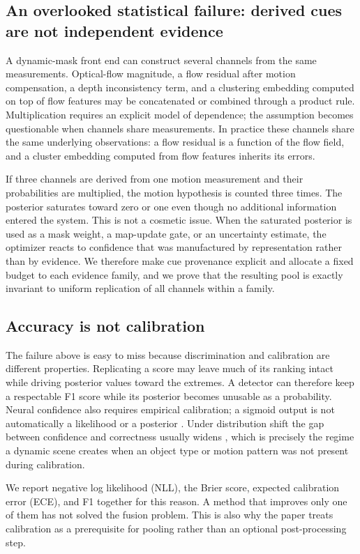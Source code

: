 \documentclass[10pt,conference]{IEEEtran}
\begin{document}
\subsection{An overlooked statistical failure: derived cues are not independent evidence}
A dynamic-mask front end can construct several channels from the same measurements. Optical-flow magnitude, a flow residual after motion compensation, a depth inconsistency term, and a clustering embedding computed on top of flow features may be concatenated or combined through a product rule. Multiplication requires an explicit model of dependence; the assumption becomes questionable when channels share measurements. In practice these channels share the same underlying observations: a flow residual is a function of the flow field, and a cluster embedding computed from flow features inherits its errors.

If three channels are derived from one motion measurement and their probabilities are multiplied, the motion hypothesis is counted three times. The posterior saturates toward zero or one even though no additional information entered the system. This is not a cosmetic issue. When the saturated posterior is used as a mask weight, a map-update gate, or an uncertainty estimate, the optimizer reacts to confidence that was manufactured by representation rather than by evidence. We therefore make cue provenance explicit and allocate a fixed budget to each evidence family, and we prove that the resulting pool is exactly invariant to uniform replication of all channels within a family.

\subsection{Accuracy is not calibration}
The failure above is easy to miss because discrimination and calibration are different properties. Replicating a score may leave much of its ranking intact while driving posterior values toward the extremes. A detector can therefore keep a respectable F1 score while its posterior becomes unusable as a probability. Neural confidence also requires empirical calibration; a sigmoid output is not automatically a likelihood or a posterior \cite{guo2017calibration}. Under distribution shift the gap between confidence and correctness usually widens \cite{ovadia2019trust}, which is precisely the regime a dynamic scene creates when an object type or motion pattern was not present during calibration.

We report negative log likelihood (NLL), the Brier score, expected calibration error (ECE), and F1 together for this reason. A method that improves only one of them has not solved the fusion problem. This is also why the paper treats calibration as a prerequisite for pooling rather than an optional post-processing step.
\end{document}
